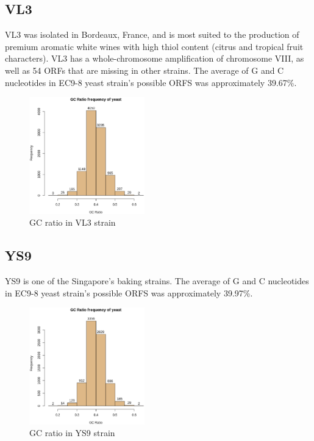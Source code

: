 \documentclass{article}
\begin{document}
\subsection{VL3}

VL3 was isolated in Bordeaux, France, and is most suited to the production of premium aromatic 
white wines with high thiol content (citrus and tropical fruit characters). 
VL3 has a whole-chromosome amplification of chromosome VIII, as well as 54 ORFs that are missing in other strains.
The average of G and C nucleotides in EC9-8 yeast strain's possible ORFS was approximately 39.67\%. 

\begin{figure}[H]
\vspace{30pt}%
\includegraphics[width=50mm,scale=0.3]{images/VL3_AWRI_2011_AEJS01000000.eps}
\caption{GC ratio in VL3 strain}
\label{fig:method}
\end{figure}

\subsection{YS9}

YS9 is one of the Singapore's baking strains.
The average of G and C nucleotides in EC9-8 yeast strain's possible ORFS was approximately 39.97\%.

\begin{figure}[H]
\vspace{30pt}%
\includegraphics[width=50mm,scale=0.3]{images/YS9_Stanford_2014_JRIB00000000.eps}
\caption{GC ratio in YS9 strain}
\label{fig:method}
\end{figure}
\end{document}
